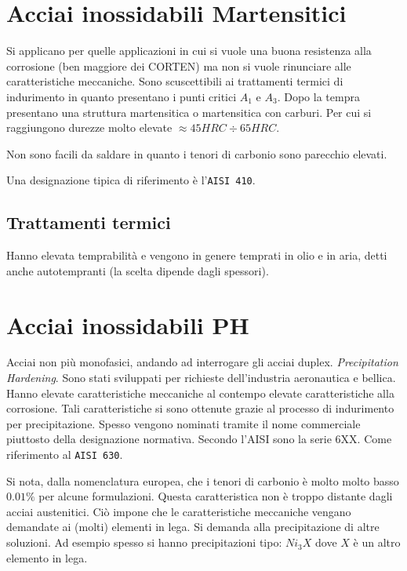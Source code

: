 \section{Acciai inossidabili Martensitici}
Si applicano per quelle applicazioni in cui si vuole una buona resistenza
alla corrosione (ben maggiore dei CORTEN) ma non si vuole rinunciare
alle caratteristiche meccaniche.
Sono scuscettibili ai trattamenti termici di indurimento in quanto presentano 
i punti critici $A_1$ e $A_3$. 
Dopo la tempra presentano una struttura martensitica o martensitica con 
carburi. Per cui si raggiungono durezze molto elevate $\approx 45\unit{HRC}
\div 65\unit{HRC}$.

Non sono facili da saldare in quanto i tenori di carbonio sono parecchio 
elevati.

Una designazione tipica di riferimento è l'\texttt{AISI 410}.

\subsection{Trattamenti termici}

Hanno elevata temprabilità e vengono in genere temprati in olio e in aria, 
detti anche autotempranti (la scelta dipende dagli spessori).

\section{Acciai inossidabili PH}

Acciai non più monofasici, andando ad interrogare gli acciai duplex.
\emph{Precipitation Hardening}. 
Sono stati sviluppati per richieste dell'industria aeronautica e bellica.
Hanno elevate caratteristiche meccaniche al contempo elevate caratteristiche
alla corrosione.
Tali caratteristiche si sono ottenute grazie al processo di indurimento per
precipitazione.
Spesso vengono nominati tramite il nome commerciale piuttosto della
designazione normativa.
Secondo l'AISI  sono la serie 6XX. Come riferimento al
\texttt{AISI 630}.

Si nota, dalla nomenclatura europea, che i tenori di carbonio è molto
molto basso $0.01\%$ per alcune formulazioni.
Questa caratteristica non è troppo distante dagli acciai austenitici.
Ciò impone che le caratteristiche meccaniche vengano demandate ai (molti)
elementi in lega. Si demanda alla precipitazione di altre soluzioni.
Ad esempio spesso si hanno precipitazioni tipo: $Ni_3X$ dove $X$ è un
altro elemento in lega.
